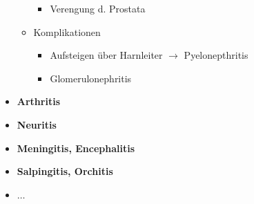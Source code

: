 \begin{itemize}
\begin{itemize}
\begin{itemize}
							\item Verengung d. Prostata
						\end{itemize}
					\item Komplikationen
						\begin{itemize}
							\item Aufsteigen über Harnleiter $\rightarrow$ Pyelonepthritis
							\item Glomerulonephritis
						\end{itemize}
				\end{itemize}
			\item \textbf{Arthritis}
			\item \textbf{Neuritis}
			\item \textbf{Meningitis, Encephalitis}
			\item \textbf{Salpingitis, Orchitis}
			\item \textbf{$\dots$}
	\end{itemize}